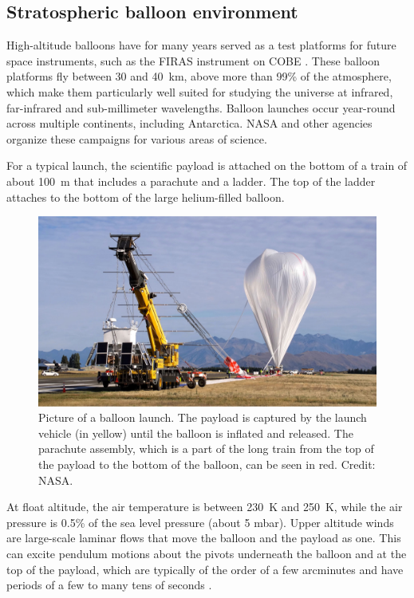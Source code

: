 \subsection{Stratospheric balloon environment}

High-altitude balloons have for many years served as a test platforms for future space instruments, such as the FIRAS instrument on COBE \citep{Fixsen:2002jv}. These balloon platforms fly between 30 and \SI{40}{\kilo\meter}, above more than 99\% of the atmosphere, which make them particularly well suited for studying the universe at infrared, far-infrared and sub-millimeter wavelengths. Balloon launches occur year-round across multiple continents, including Antarctica. NASA and other agencies organize these campaigns for various areas of science.

For a typical launch, the scientific payload is attached on the bottom of a train of about \SI{100}{\meter} that includes a parachute and a ladder. The top of the ladder attaches to the bottom of the large helium-filled balloon. 
\begin{figure}[!ht]
	\centering
	\includegraphics[width=\textwidth]{Figures/balloonLaunch.jpg} 
	\caption[Balloon launch]{Picture of a balloon launch. The payload is captured by the launch vehicle (in yellow) until the balloon is inflated and released. The parachute assembly, which is a part of the long train from the top of the payload to the bottom of the balloon, can be seen in red. Credit: NASA.}
	\label{fig:BalloonLaunch}
    \end{figure}





At float altitude, the air temperature is between \SI{230}{\kelvin} and \SI{250}{\kelvin}, while the air pressure is 0.5\% of the sea level pressure (about 5 mbar). Upper altitude winds are large-scale laminar flows that move the balloon and the payload as one. This can excite pendulum motions about the pivots underneath the balloon and at the top of the payload, which are typically of the order of a few arcminutes and have periods of a few to many tens of seconds \citep{Fixsen:1996kha}.

